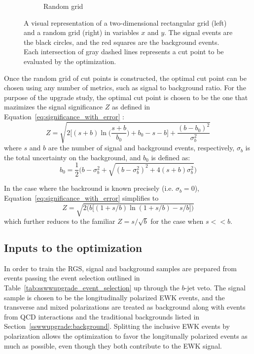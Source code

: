 \begin{figure}[htp]
\begin{subfigure}[b]{.48\textwidth}
    \caption{Random grid}
    \label{fig:rgs_grids_random}
  \end{subfigure}
  \caption{A visual representation of a two-dimensional rectangular grid (left) and a random grid (right) in variables $x$ and $y$.  The signal events are the black circles, and the red squares are the background events.  Each intersection of gray dashed lines represents a cut point to be evaluated by the optimization.}
  \label{fig:rgs_grids}
\end{figure}

Once the random grid of cut points is constructed, the optimal cut point can be chosen using any number of metrics, such as signal to background ratio.
For the purpose of the \ssww upgrade study, the optimal cut point is chosen to be the one that mazimizes the signal significance $Z$ as defined in Equation~\ref{eq:significance_with_error} \cite{2011.asimov-significance}:
\begin{equation}
Z = \sqrt{2{\bigg[}(s+b)\ln{\Big(}\frac{s+b}{b_0}{\Big)}+b_0-s-b{\bigg]}+\frac{(b-b_0)^2}{\sigma_b^2}}
\label{eq:significance_with_error}
\end{equation}
where $s$ and $b$ are the number of signal and background events, respectively, $\sigma_b$ is the total uncertainty on the background, and $b_0$ is defined as:
\begin{equation}
b_0 = \frac{1}{2}{\Big(}b-\sigma_b^2+\sqrt{(b-\sigma_b^2)^2+4(s+b)\sigma_b^2}{\Big)}
\label{eq:significance_b0}
\end{equation}

In the case where the backround is known precisely (i.e. $\sigma_b = 0$), Equation~\ref{eq:significance_with_error} simplifies to
\begin{equation}
Z = \sqrt{2\bigg(b\big[(1+s/b)\ln(1+s/b)-s/b\big]\bigg)}
\label{eq:significance_without_error}
\end{equation}
which further reduces to the familiar $Z = s/\sqrt{b}$ for the case when $s << b$.

%
\subsection{Inputs to the optimization}\label{sswwupgrade:opt_inputs}
In order to train the RGS, signal and background samples are prepared from events passing the event selection outlined in Table~\ref{tab:sswwupgrade_event_selection} up through the $b$-jet veto.
The signal sample is chosen to be the longitudinally polarized \ssww EWK events, and the transverse and mixed polarizations are treated as background along with \ssww events from QCD interactions and the traditional backgrounds listed in Section~\ref{sswwupgrade:background}.
Splitting the inclusive \ssww EWK events by polarization allows the optimization to favor the longitunally polarized events as much as possible, even though they both contribute to the EWK signal.

